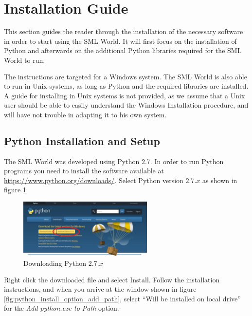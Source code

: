 
\graphicspath{ {SectionInstallationGuide/} }

\section{Installation Guide}
\label{sec:installation_guide}

This section guides the reader through the installation of the necessary software in order to start using the SML World. It will first focus on the installation of Python and afterwards on the additional Python libraries required for the SML World to run.

The instructions are targeted for a Windows system. The SML World is also able to run in Unix systems, as long as Python and the required libraries are installed. A guide for installing in Unix systems is not provided, as we assume that a Unix user should be able to easily understand the Windows Installation procedure, and will have not trouble in adapting it to his own system.

\subsection{Python Installation and Setup}

The SML World was developed using Python 2.7. In order to run Python programs you need to install the software available at \url{https://www.python.org/downloads/}. Select Python version $2.7.x$ as shown in figure \ref{fig:python_install_download}

\begin{figure}[h!]
  \centering
    \includegraphics[width=0.6\textwidth]{python_install_1}
    \caption{Downloading Python $2.7.x$ \label{fig:python_install_download} }
\end{figure}


Right click the downloaded file and select Install. Follow the installation instructions, and when you arrive at the window shown in figure \ref{fig:python_install_option_add_path}, select “Will be installed on local drive” for the \textit{Add python.exe to Path} option.

